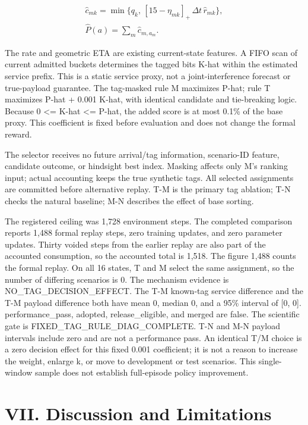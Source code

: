 \begin{equation*}
\begin{gathered}
\widehat c_{mk}=\min\{q_k,\,[15-\eta_{mk}]_+\,\Delta t\,\widehat r_{mk}\},\\ \widehat P(a)=\sum_m\widehat c_{m,a_m}.
\end{gathered}
\end{equation*}

The rate and geometric ETA are existing current-state features. A FIFO scan of current admitted buckets determines the tagged bits K-hat within the estimated service prefix. This is a static service proxy, not a joint-interference forecast or true-payload guarantee. The tag-masked rule M maximizes P-hat; rule T maximizes P-hat + 0.001 K-hat, with identical candidate and tie-breaking logic. Because 0 <= K-hat <= P-hat, the added score is at most 0.1\% of the base proxy. This coefficient is fixed before evaluation and does not change the formal reward.

The selector receives no future arrival/tag information, scenario-ID feature, candidate outcome, or hindsight best index. Masking affects only M's ranking input; actual accounting keeps the true synthetic tags. All selected assignments are committed before alternative replay. T-M is the primary tag ablation; T-N checks the natural baseline; M-N describes the effect of base sorting.

The registered ceiling was 1,728 environment steps. The completed comparison reports 1,488 formal replay steps, zero training updates, and zero parameter updates. Thirty voided steps from the earlier replay are also part of the accounted consumption, so the accounted total is 1,518. The figure 1,488 counts the formal replay. On all 16 states, T and M select the same assignment, so the number of differing scenarios is 0. The mechanism evidence is NO\_TAG\_DECISION\_EFFECT. The T-M known-tag service difference and the T-M payload difference both have mean 0, median 0, and a 95\% interval of [0, 0]. performance\_pass, adopted, release\_eligible, and merged are false. The scientific gate is FIXED\_TAG\_RULE\_DIAG\_COMPLETE. T-N and M-N payload intervals include zero and are not a performance pass. An identical T/M choice is a zero decision effect for this fixed 0.001 coefficient; it is not a reason to increase the weight, enlarge k, or move to development or test scenarios. This single-window sample does not establish full-episode policy improvement.

\section*{VII. Discussion and Limitations}


